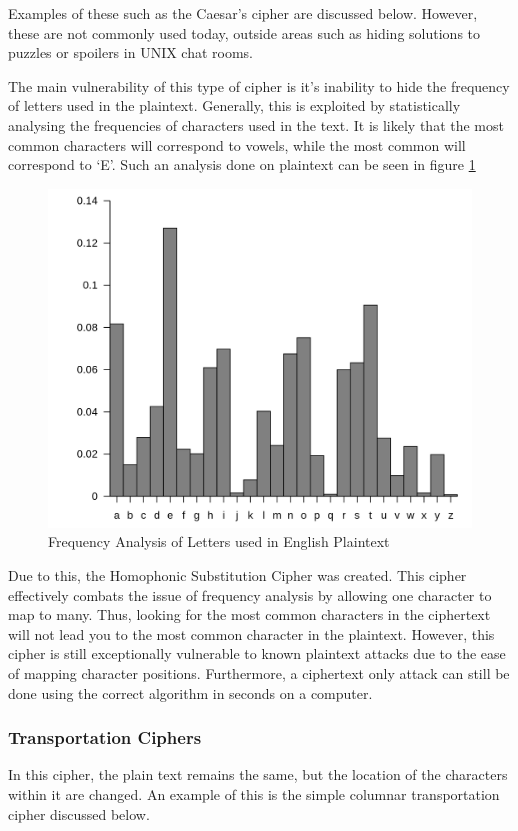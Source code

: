 				Examples of these such as the Caesar's cipher are discussed below. 
				However, these are not commonly used today, outside areas such as hiding solutions to puzzles or spoilers in UNIX chat rooms. 

				The main vulnerability of this type of cipher is it's inability to hide the frequency of letters used in the plaintext. 
				Generally, this is exploited by statistically analysing the frequencies of characters used in the text. 
				It is likely that the most common characters will correspond to vowels, while the most common will correspond to `E'. 
				Such an analysis done on plaintext can be seen in figure \ref{fig:LetterFreq}
				\begin{figure}[htb]
					\centering
					\includegraphics[scale=0.2]{./letterFreq.png}
					\caption{Frequency Analysis of Letters used in English Plaintext}
					\label{fig:LetterFreq}
				\end{figure}

				Due to this, the Homophonic Substitution Cipher was created. 
				This cipher effectively combats the issue of frequency analysis by allowing one character to map to many. 
				Thus, looking for the most common characters in the ciphertext will not lead you to the most common character in the plaintext. 
				However, this cipher is still exceptionally vulnerable to known plaintext attacks due to the ease of mapping character positions. 
				Furthermore, a ciphertext only attack can still be done using the correct algorithm in seconds on a computer. 
			\subsubsection{Transportation Ciphers}
				In this cipher, the plain text remains the same, but the location of the characters within it are changed. 
				An example of this is the simple columnar transportation cipher discussed below. 

